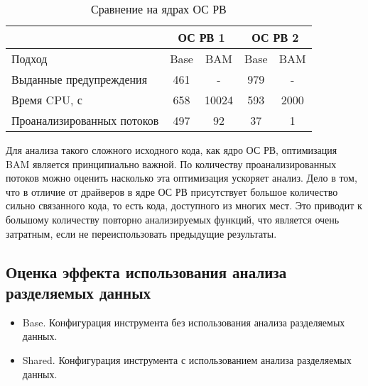   \begin{table}[h]\footnotesize \centering
    \caption{Сравнение на ядрах ОС РВ}
  	\label{table-os-bam}
    \begin{tabular}{ | l | c | c | c | c |  }
      \hline
      		& 			 \multicolumn{2}{|c|}{ОС РВ 1} & 	\multicolumn{2}{|c|}{ОС РВ 2}\\ \hline
      Подход         					& Base  & BAM  		& Base  & BAM 	\\ \hline
      Выданные предупреждения			& 461   & - 	   	& 979   & -  			\\ 
  	  Время CPU, с 						& 658   & 10024		& 593   & 2000  		\\ 
      Проанализированных потоков		& 497   & 92    	& 37   	& 1  			\\ \hline
      \hline
    \end{tabular}
  \end{table}

Для анализа такого сложного исходного кода, как ядро ОС РВ, оптимизация BAM является принципиально важной.
По количеству проанализированных потоков можно оценить насколько эта оптимизация ускоряет анализ.
Дело в том, что в отличие от драйверов в ядре ОС РВ присутствует большое количество сильно связанного кода, то есть кода, доступного из многих мест. 
Это приводит к большому количеству повторно анализируемых функций, что является очень затратным, если не переиспользовать предыдущие результаты.

%
%

\subsection{Оценка эффекта использования анализа разделяемых данных}

\begin{itemize}
\item Base. Конфигурация инструмента без использования анализа разделяемых данных.
\item Shared. Конфигурация инструмента с использованием анализа разделяемых данных.
\end{itemize}

